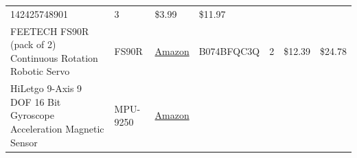 \documentclass[]{article}
\begin{document}
\begin{longtable}[]{@{}lllllll@{}}
\begin{minipage}[t]{0.17\columnwidth}
142425748901\strut
\end{minipage} & \begin{minipage}[t]{0.11\columnwidth}\raggedright
3\strut
\end{minipage} & \begin{minipage}[t]{0.06\columnwidth}\raggedright
\$3.99\strut
\end{minipage} & \begin{minipage}[t]{0.07\columnwidth}\raggedright
\$11.97\strut
\end{minipage}\tabularnewline
\begin{minipage}[t]{0.15\columnwidth}\raggedright
FEETECH FS90R (pack of 2) Continuous Rotation Robotic Servo\strut
\end{minipage} & \begin{minipage}[t]{0.15\columnwidth}\raggedright
FS90R\strut
\end{minipage} & \begin{minipage}[t]{0.10\columnwidth}\raggedright
\href{https://www.amazon.com/gp/product/B074BFQC3Q/ref=oh_aui_detailpage_o06_s00?ie=UTF8\&psc=1}{Amazon}\strut
\end{minipage} & \begin{minipage}[t]{0.17\columnwidth}\raggedright
B074BFQC3Q\strut
\end{minipage} & \begin{minipage}[t]{0.11\columnwidth}\raggedright
2\strut
\end{minipage} & \begin{minipage}[t]{0.06\columnwidth}\raggedright
\$12.39\strut
\end{minipage} & \begin{minipage}[t]{0.07\columnwidth}\raggedright
\$24.78\strut
\end{minipage}\tabularnewline
\begin{minipage}[t]{0.15\columnwidth}\raggedright
HiLetgo 9-Axis 9 DOF 16 Bit Gyroscope Acceleration Magnetic Sensor\strut
\end{minipage} & \begin{minipage}[t]{0.15\columnwidth}\raggedright
MPU-9250\strut
\end{minipage} & \begin{minipage}[t]{0.10\columnwidth}\raggedright
\href{https://www.amazon.com/HiLetgo-Gyroscope-Acceleration-Accelerator-Magnetometer/dp/B01I1J0Z7Y/ref=redir_mobile_desktop?_encoding=UTF8\&dpID=51nl2fcMh6L\&dpPl=1\&keywords=mpu\%209250\&pi=AC_SX236_SY340_QL65\&qid=1512564044\&ref=plSrch\&ref_=mp_s_a_1_3\&sr=8-3}{Amazon}\strut

\end{minipage}
\end{longtable}
\end{document}
